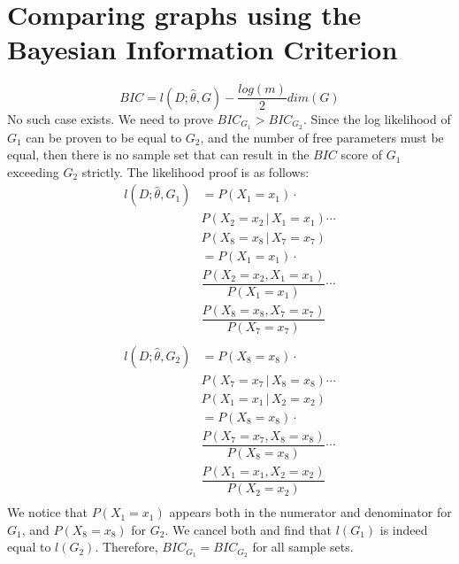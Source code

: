 \documentclass[9pt,twocolumn]{article}
\begin{document}
\section{Comparing graphs using the Bayesian Information Criterion}
\begin{equation}
    BIC = \mathit{l(D;\hat{\theta},G)} - \dfrac{log(m)}{2} dim(G)
\end{equation}
No such case exists. We need to prove $BIC_{G_1} > BIC_{G_2}$. Since the log likelihood of $G_1$ can be proven to be equal to $G_2$, and the number of free parameters must be equal, then there is no sample set that can result in the $BIC$ score of $G_1$ exceeding $G_2$ strictly. The likelihood proof is as follows:
\begin{equation}
\begin{split}
    \mathit{l}(D;\hat{\theta},G_1) & = P(X_1=x_1)\cdot \\
    & P(X_2=x_2\,|\,X_1=x_1) \cdots\\
    & P(X_8=x_8\,|\,X_7=x_7)\\
    & = P(X_1=x_1)\cdot \\
    & \dfrac{P(X_2=x_2,X_1=x_1)}{P(X_1=x_1)} \cdots\\
    & \dfrac{P(X_8=x_8,X_7=x_7)}{P(X_7=x_7)}\\
\end{split}
\end{equation}
\begin{equation}
\begin{split}
    \mathit{l}(D;\hat{\theta},G_2) & = P(X_8=x_8)\cdot \\
    & P(X_7=x_7\,|\,X_8=x_8) \cdots\\
    & P(X_1=x_1\,|\,X_2=x_2)\\
    & = P(X_8=x_8)\cdot \\
    & \dfrac{P(X_7=x_7,X_8=x_8)}{P(X_8=x_8)} \cdots\\
    & \dfrac{P(X_1=x_1,X_2=x_2)}{P(X_2=x_2)}\\
\end{split}
\end{equation}
We notice that $P(X_1=x_1)$ appears both in the numerator and denominator for $G_1$, and $P(X_8=x_8)$ for $G_2$. We cancel both and find that $\mathit{l}(G_1)$ is indeed equal to $\mathit{l}(G_2)$. Therefore, $BIC_{G_1} = BIC_{G_2}$ for all sample sets.
\end{document}
